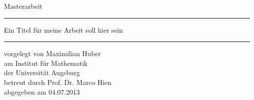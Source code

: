 
\begin{titlepage}
  \thispagestyle{empty}
  \newcommand{\Rule}{%
    \textcolor{black}{\rule{\textwidth}{0.5mm}}%
  }
  \begin{center}\sffamily
    \normalfont\sffamily\large
    Masterarbeit
    \Rule
    \vspace{5mm}
    \Huge{Ein Titel für meine Arbeit soll hier sein}
    \vspace{1mm}
    \Rule
  \end{center}
    \normalfont\sffamily\large vorgelegt von \Large Maximilian Huber\\
    \normalfont\sffamily\large am            \Large Institut für Mathematik\\
    \normalfont\sffamily\large der           \Large Universität Augsburg\\
    \normalfont\sffamily\large betreut durch \Large Prof. Dr. Marco Hien\\
    \normalfont\sffamily\large abgegeben am  \Large 04.07.2013\\
    \vfill
    \vfill
\end{titlepage}

\restoregeometry
